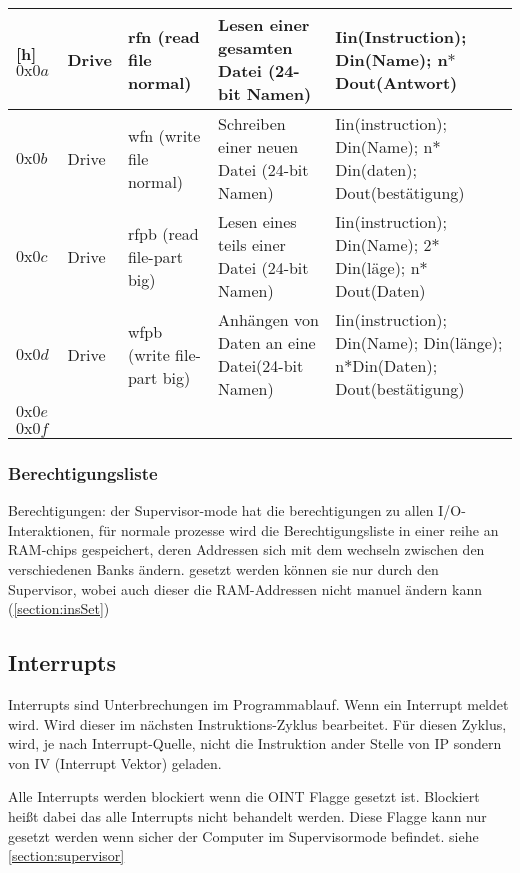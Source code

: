 \documentclass{scrartcl}
\begin{document}
\begin{center}
\begin{longtable}{p{} | p{} | p{} | p{} | p{}}[h]
			\hline
			 $0\text{x}0a$ & Drive & rfn (read file normal) & Lesen einer gesamten Datei (24-bit Namen)  & Iin(Instruction); Din(Name); n$*$Dout(Antwort) \\
			\hline
			 $0\text{x}0b$ & Drive & wfn (write file normal) & Schreiben einer neuen Datei (24-bit Namen) & Iin(instruction); Din(Name); n$*$Din(daten); Dout(bestätigung) \\
			\hline
			 $0\text{x}0c$ & Drive & rfpb (read file-part big) & Lesen eines teils einer Datei (24-bit Namen) & Iin(instruction); Din(Name); 2$*$Din(läge); n$*$Dout(Daten) \\
			\hline
			 $0\text{x}0d$ & Drive & wfpb (write file-part big) & Anhängen von Daten an eine Datei(24-bit Namen) & Iin(instruction); Din(Name); Din(länge); n$*$Din(Daten); Dout(bestätigung) \\
			\hline
			 $0\text{x}0e$ &  & & & \\
			\hline
			 $0\text{x}0f$ &  & & &

	\end{longtable}
\end{center}


\subsubsection{\label{section:persmissionIO}Berechtigungsliste}

Berechtigungen: der Supervisor-mode hat die berechtigungen zu allen I/O-Interaktionen, für normale prozesse wird die Berechtigungsliste in einer reihe an RAM-chips gespeichert, deren Addressen sich mit dem wechseln zwischen den verschiedenen Banks ändern.
gesetzt werden können sie nur durch den Supervisor, wobei auch dieser die RAM-Addressen nicht manuel ändern kann (\autoref{section:insSet})




\subsection{\label{section:interrupts}Interrupts}

Interrupts sind Unterbrechungen im Programmablauf. Wenn ein Interrupt meldet wird. Wird dieser im nächsten Instruktions-Zyklus bearbeitet. Für diesen Zyklus, wird, je nach Interrupt-Quelle, nicht die Instruktion ander Stelle von IP sondern von IV (Interrupt Vektor) geladen.

Alle Interrupts werden blockiert wenn die OINT Flagge gesetzt ist. Blockiert heißt dabei das alle Interrupts nicht behandelt werden. Diese Flagge kann nur gesetzt werden wenn sicher der Computer im Supervisormode befindet. siehe \ref*{section:supervisor}
\end{document}
